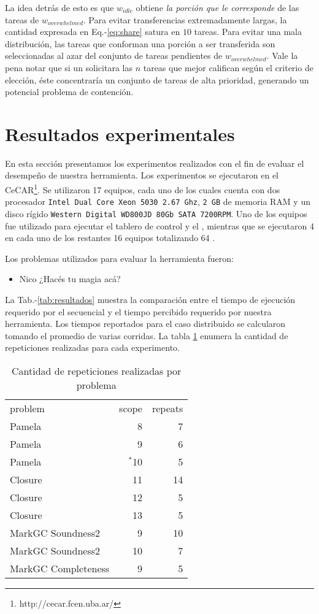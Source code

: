 La idea detrás de esto es que $w_{idle}$
obtiene \emph{la porción que le corresponde} de las tareas de
$w_{overwhelmed}$. Para evitar transferencias extremadamente largas, la
cantidad expresada en Eq.-\ref{eq:share} satura en $10$ tareas. Para evitar
una mala distribución, las tareas que conforman una porción a ser transferida
son seleccionadas al azar del conjunto de tareas pendientes de
$w_{overwhelmed}$. Vale la pena notar que si un \w solicitara las $n$ tareas que mejor califican según el criterio de elección, éste concentraría un conjunto de tareas de alta prioridad, generando un potencial problema de contención.

\section{Resultados experimentales}

En esta sección presentamos los experimentos realizados con el fin de evaluar
el desempeño de nuestra herramienta.  Los experimentos se ejecutaron en el
\cluster CeCAR\footnote{http://cecar.fcen.uba.ar/}. Se utilizaron 17 equipos,
cada uno de los cuales cuenta con dos procesador \texttt{Intel Dual Core Xeon
5030 2.67 Ghz}, \texttt{2 GB} de memoria RAM y un disco rígido \texttt{Western
Digital WD800JD 80Gb SATA 7200RPM}. Uno de los equipos fue utilizado para
ejecutar el tablero de control y el \master, mientras que se ejecutaron 4 \ws
en cada uno de los restantes 16 equipos totalizando 64 \ws.

Los problemas utilizados para evaluar la herramienta fueron:
\begin{itemize}
	\item Nico ¿Hacés tu magia acá?
\end{itemize}

La Tab.-\ref{tab:resultados} muestra la comparación entre el tiempo de
ejecución requerido por el \ssolver secuencial y el tiempo percibido requerido
por nuestra herramienta. Los tiempos reportados para el caso distribuido se
calcularon tomando el promedio de varias corridas. La tabla
\ref{tab:repeticiones} enumera la cantidad de repeticiones realizadas para
cada experimento. 

\begin{table}
	\footnotesize
	\begin{tabular}{lrr}
		\toprule
		problem	&	scope	&	repeats	\\
		\cmidrule(r){1-3}
		Pamela	&	8	&	7	\\
		Pamela	&	9	&	6 \\
		Pamela	&	$^*$10	&	5 \\
		\cmidrule(r){1-3}
		Closure	&	11	&	14	\\
		Closure	&	12	&	5	\\
		Closure	&	13	&	5 \\
		\cmidrule(r){1-3}
		MarkGC Soundness2	&	9	&	10	\\
		MarkGC Soundness2	&	10	&	7	\\
		\cmidrule(r){1-3}
		MarkGC Completeness	&	9	&	5 \\
		\bottomrule
	\end{tabular}
	\caption{Cantidad de repeticiones realizadas por problema}
	\label{tab:repeticiones}
\end{table}



